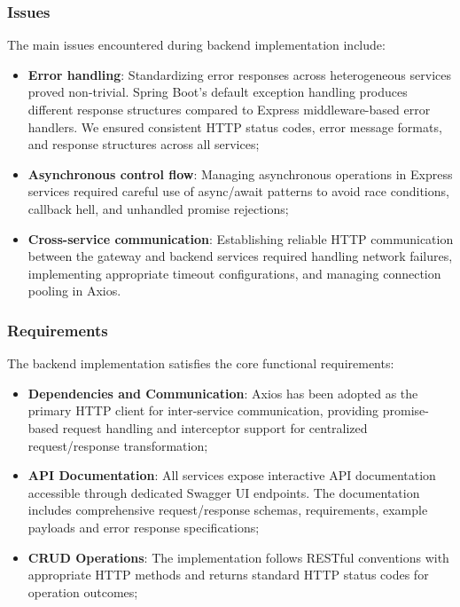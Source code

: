 \documentclass[11pt,a4paper]{article}
\begin{document}
\subsubsection{Issues}
The main issues encountered during backend implementation include:
\begin{itemize}
    \item \textbf{Error handling}: Standardizing error responses across heterogeneous services proved non-trivial. Spring Boot's default exception handling produces different response structures compared to Express middleware-based error handlers. We ensured consistent HTTP status codes, error message formats, and response structures across all services;

    \item \textbf{Asynchronous control flow}: Managing asynchronous operations in Express services required careful use of async/await patterns to avoid race conditions, callback hell, and unhandled promise rejections;

    \item \textbf{Cross-service communication}: Establishing reliable HTTP communication between the gateway and backend services required handling network failures, implementing appropriate timeout configurations, and managing connection pooling in Axios.
\end{itemize}

\subsubsection{Requirements}
The backend implementation satisfies the core functional requirements:
\begin{itemize}
    \item \textbf{Dependencies and Communication}: Axios has been adopted as the primary HTTP client for inter-service communication, providing promise-based request handling and interceptor support for centralized request/response transformation;
    \item \textbf{API Documentation}: All services expose interactive API documentation accessible through dedicated Swagger UI endpoints. The documentation includes comprehensive request/response schemas, requirements, example payloads and error response specifications;
    \item \textbf{CRUD Operations}: The implementation follows RESTful conventions with appropriate HTTP methods and returns standard HTTP status codes for operation outcomes;
\end{itemize}
\end{document}
